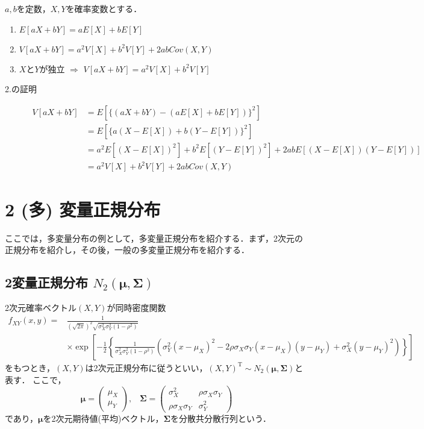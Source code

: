 \documentclass{jsreport}
\begin{document}
\begin{screen}
  \begin{theo}
    $a, b$を定数，$X, Y$を確率変数とする．
    \begin{enumerate}
      \item $E[aX + bY] = aE[X] + bE[Y]$
      \item $V[aX + bY] = a^2V[X] + b^2V[Y] + 2abCov(X, Y)$
      \item $X$と$Y$が独立 $\Longrightarrow$ $V[aX + bY] = a^2V[X] + b^2V[Y]$
    \end{enumerate}
  \end{theo}
\end{screen}
\begin{description}
  \item[2.の証明]
  \begin{align}
    V[aX + bY] &= E[\{(aX + bY) - (aE[X] + bE[Y])\}^2] \nonumber \\
    &= E[\{a(X - E[X]) + b(Y - E[Y])\}^2] \nonumber \\
    &= a^2 E[(X - E[X])^2] + b^2 E[(Y - E[Y])^2] + 2ab E[(X - E[X])(Y - E[Y])] \nonumber \\
    &= a^2 V[X] + b^2 V[Y] + 2ab Cov(X, Y) \nonumber
  \end{align}
\end{description}

\section{2 (多) 変量正規分布}
ここでは，多変量分布の例として，多変量正規分布を紹介する．まず，2次元の正規分布を紹介し，その後，一般の多変量正規分布を紹介する．

\subsection{2変量正規分布 $N_2(\bm{\mu}, \bm{\Sigma})$}
2次元確率ベクトル$(X, Y)$が同時密度関数
\begin{align}
  f_{XY}(x, y) = &\frac{1}{(\sqrt{2\pi})^2 \sqrt{\sigma_X^2 \sigma_Y^2 (1 - \rho^2)}} \nonumber \\
  &\times \exp\left[-\frac{1}{2}\left\{\frac{1}{\sigma_X^2 \sigma_Y^2 (1 - \rho^2)} \left( \sigma_Y^2(x - \mu_X)^2 - 2\rho \sigma_X \sigma_Y (x - \mu_X)(y - \mu_Y) + \sigma_X^2 (y - \mu_Y)^2 \right)\right\}\right] \nonumber
\end{align}
をもつとき，$(X, Y)$は2次元正規分布に従うといい，$(X, Y)^{\mathrm{T}} \sim N_2(\bm{\mu}, \bm{\Sigma})$と表す．
ここで，
\begin{equation}
  \bm{\mu} = \left(
  \begin{array}{c}
    \mu_X \\
    \mu_Y
  \end{array}
  \right), \; \; \;
  \bm{\Sigma} = \left(
  \begin{array}{cc}
    \sigma_X^2 & \rho \sigma_X \sigma_Y \\
    \rho \sigma_X \sigma_Y & \sigma_Y^2
  \end{array}
  \right) \nonumber
\end{equation}
であり，$\bm{\mu}$を2次元期待値(平均)ベクトル，$\bm{\Sigma}$を分散共分散行列という．
\end{document}
